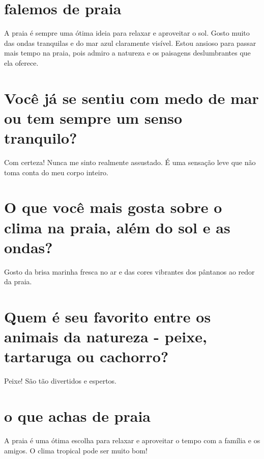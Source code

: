\documentclass[11pt,a4paper]{article}
\begin{document}
\maketitle
\begin{abstract}Exploração do ollama a partir de sementes banais (nível 1). Teoria continua de fora.\end{abstract}
\section{falemos de praia}
A praia é sempre uma ótima ideia para relaxar e aproveitar o sol. Gosto muito das ondas tranquilas e do mar azul claramente visível. Estou ansioso para passar mais tempo na praia, pois admiro a natureza e os paisagens deslumbrantes que ela oferece.

\section{Você já se sentiu com medo de mar ou tem sempre um senso tranquilo?}
Com certeza! Nunca me sinto realmente assustado. É uma sensação leve que não toma conta do meu corpo inteiro.

\section{O que você mais gosta sobre o clima na praia, além do sol e as ondas?}
Gosto da brisa marinha fresca no ar e das cores vibrantes dos pântanos ao redor da praia.

\section{Quem é seu favorito entre os animais da natureza - peixe, tartaruga ou cachorro?}
Peixe! São tão divertidos e espertos.

\section{o que achas de praia}
A praia é uma ótima escolha para relaxar e aproveitar o tempo com a família e os amigos. O clima tropical pode ser muito bom!
\end{document}
